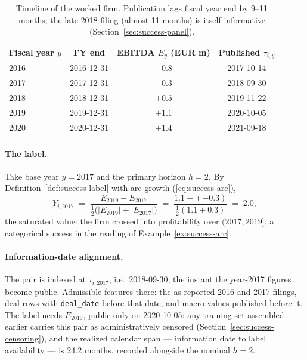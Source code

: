 \begin{table}[htbp]
\centering
\small
\begin{tabular}{lccc}
\toprule
Fiscal year $y$ & FY end & EBITDA $E_y$ (EUR m) & Published $\tau_{i,y}$ \\
\midrule
2016 & 2016-12-31 & $-0.8$ & 2017-10-14 \\
2017 & 2017-12-31 & $-0.3$ & 2018-09-30 \\
2018 & 2018-12-31 & $+0.5$ & 2019-11-22 \\
2019 & 2019-12-31 & $+1.1$ & 2020-10-05 \\
2020 & 2020-12-31 & $+1.4$ & 2021-09-18 \\
\bottomrule
\end{tabular}
\caption{Timeline of the worked firm. Publication lags fiscal year end by 9--11
months; the late 2018 filing (almost 11 months) is itself informative
(Section~\ref{sec:success-panel}).}
\label{tab:success-timeline}
\end{table}

\paragraph{The label.} Take base year $y = 2017$ and the primary horizon $h = 2$. By
Definition~\ref{def:success-label} with arc growth (\ref{eq:success-arc}),
\begin{equation}
\label{eq:success-worked-label}
Y_{i,2017} \;=\; \frac{E_{2019} - E_{2017}}{\tfrac{1}{2}\big(|E_{2019}| +
|E_{2017}|\big)}
\;=\; \frac{1.1 - (-0.3)}{\tfrac{1}{2}(1.1 + 0.3)} \;=\; 2.0,
\end{equation}
the saturated value: the firm crossed into profitability over $(2017, 2019]$, a
categorical success in the reading of Example~\ref{ex:success-arc}.

\paragraph{Information-date alignment.} The pair is indexed at $\tau_{i,2017}$, i.e.\
2018-09-30, the instant the year-2017 figures become public. Admissible features
there: the as-reported 2016 and 2017 filings, deal rows with \texttt{deal\_date}
before that date, and macro values published before it. The label needs $E_{2019}$,
public only on 2020-10-05: any training set assembled earlier carries this pair as
administratively censored (Section~\ref{sec:success-censoring}), and the realized
calendar span --- information date to label availability --- is 24.2 months, recorded
alongside the nominal $h = 2$.

